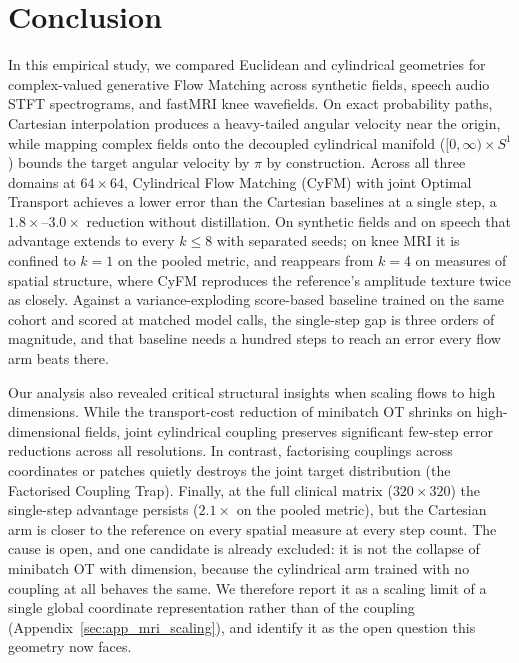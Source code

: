 \section{Conclusion}
\label{sec:conclusion}

In this empirical study, we compared Euclidean and cylindrical geometries for complex-valued generative Flow Matching across synthetic fields, speech audio STFT spectrograms, and fastMRI knee wavefields. On exact probability paths, Cartesian interpolation produces a heavy-tailed angular velocity near the origin, while mapping complex fields onto the decoupled cylindrical manifold ($[0, \infty) \times S^1$) bounds the target angular velocity by $\pi$ by construction. Across all three domains at $64\times64$, Cylindrical Flow Matching (CyFM) with joint Optimal Transport achieves a lower error than the Cartesian baselines at a single step, a $1.8\times$--$3.0\times$ reduction without distillation. On synthetic fields and on speech that advantage extends to every $k \le 8$ with separated seeds; on knee MRI it is confined to $k=1$ on the pooled metric, and reappears from $k=4$ on measures of spatial structure, where CyFM reproduces the reference's amplitude texture twice as closely. Against a variance-exploding score-based baseline trained on the same cohort and scored at matched model calls, the single-step gap is three orders of magnitude, and that baseline needs a hundred steps to reach an error every flow arm beats there.

Our analysis also revealed critical structural insights when scaling flows to high dimensions. While the transport-cost reduction of minibatch OT shrinks on high-dimensional fields, joint cylindrical coupling preserves significant few-step error reductions across all resolutions. In contrast, factorising couplings across coordinates or patches quietly destroys the joint target distribution (the Factorised Coupling Trap). Finally, at the full clinical matrix ($320\times320$) the single-step advantage persists ($2.1\times$ on the pooled metric), but the Cartesian arm is closer to the reference on every spatial measure at every step count. The cause is open, and one candidate is already excluded: it is not the collapse of minibatch OT with dimension, because the cylindrical arm trained with no coupling at all behaves the same. We therefore report it as a scaling limit of a single global coordinate representation rather than of the coupling (Appendix~\ref{sec:app_mri_scaling}), and identify it as the open question this geometry now faces.

